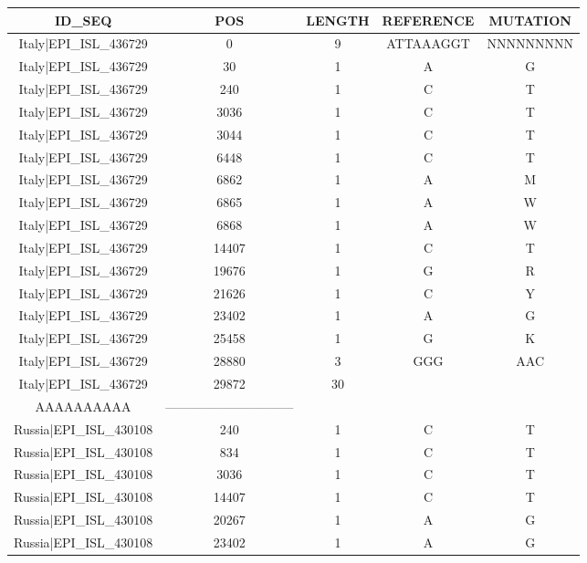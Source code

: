 \documentclass[a4paper,10pt]{article}
\begin{document}
\begin{longtable}{@{}ccccc@{}}
\toprule
\textbf{ID\_SEQ} & \textbf{POS} & \textbf{LENGTH} & \textbf{REFERENCE} & \textbf{MUTATION} \\* \midrule
\endfirsthead
%
\cline{1-5}
\endhead
%
Italy|EPI\_ISL\_436729 & 0 & 9 & ATTAAAGGT & NNNNNNNNN \\* \midrule
Italy|EPI\_ISL\_436729 & 30 & 1 & A & G \\* \midrule
Italy|EPI\_ISL\_436729 & 240 & 1 & C & T \\* \midrule
Italy|EPI\_ISL\_436729 & 3036 & 1 & C & T \\* \midrule
Italy|EPI\_ISL\_436729 & 3044 & 1 & C & T \\* \midrule
Italy|EPI\_ISL\_436729 & 6448 & 1 & C & T \\* \midrule
Italy|EPI\_ISL\_436729 & 6862 & 1 & A & M \\* \midrule
Italy|EPI\_ISL\_436729 & 6865 & 1 & A & W \\* \midrule
Italy|EPI\_ISL\_436729 & 6868 & 1 & A & W \\* \midrule
Italy|EPI\_ISL\_436729 & 14407 & 1 & C & T \\* \midrule
Italy|EPI\_ISL\_436729 & 19676 & 1 & G & R \\* \midrule
Italy|EPI\_ISL\_436729 & 21626 & 1 & C & Y \\* \midrule
Italy|EPI\_ISL\_436729 & 23402 & 1 & A & G \\* \midrule
Italy|EPI\_ISL\_436729 & 25458 & 1 & G & K \\* \midrule
Italy|EPI\_ISL\_436729 & 28880 & 3 & GGG & AAC \\* \midrule
Italy|EPI\_ISL\_436729 & 29872 & 30 & \begin{tabular}[c]{@{}c@{}}AAAAAAAAAAAAAAAAAAAA\\ AAAAAAAAAA\end{tabular} & ------------------------------ \\* \midrule
Russia|EPI\_ISL\_430108 & 240 & 1 & C & T \\* \midrule
Russia|EPI\_ISL\_430108 & 834 & 1 & C & T \\* \midrule
Russia|EPI\_ISL\_430108 & 3036 & 1 & C & T \\* \midrule
Russia|EPI\_ISL\_430108 & 14407 & 1 & C & T \\* \midrule
Russia|EPI\_ISL\_430108 & 20267 & 1 & A & G \\* \midrule
Russia|EPI\_ISL\_430108 & 23402 & 1 & A & G \\* \midrule

\end{longtable}
\end{document}

